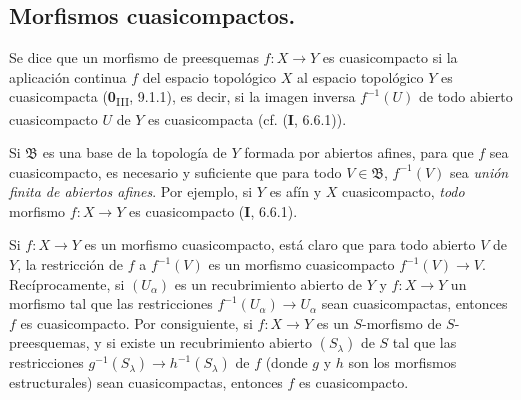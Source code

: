 \subsection{Morfismos cuasicompactos.}
\label{subsection:IV.1.1-fr}

\begin{definition}[1.1.1]
\label{IV.1.1.1-fr}
Se dice que un morfismo de preesquemas $f:X\to Y$ es cuasicompacto si
la aplicación continua $f$ del espacio topológico $X$ al espacio
topológico $Y$ es cuasicompacta \textup{(\textbf{0}\textsubscript{III}, 9.1.1)}, es
decir, si la imagen inversa $f^{-1}(U)$ de todo abierto cuasicompacto $U$ de $Y$
es cuasicompacta \textup{(cf. (\textbf{I}, 6.6.1))}.
\end{definition}

Si $\mathfrak B$ es una base de la topología de $Y$ formada por abiertos
afines, para que $f$ sea cuasicompacto, es necesario y suficiente que para todo
$V\in\mathfrak B$, $f^{-1}(V)$ sea \emph{unión finita de abiertos afines}.
Por ejemplo, si $Y$ es afín y $X$ cuasicompacto, \emph{todo} morfismo
$f:X\to Y$ es cuasicompacto (\textbf{I}, 6.6.1).

Si $f:X\to Y$ es un morfismo cuasicompacto, está claro que para todo
abierto $V$ de $Y$, la restricción de $f$ a $f^{-1}(V)$ es un morfismo
cuasicompacto $f^{-1}(V)\to V$. Recíprocamente, si $(U_\alpha)$ es un
recubrimiento abierto de $Y$ y $f:X\to Y$ un morfismo tal que las restricciones
$f^{-1}(U_\alpha)\to U_\alpha$ sean cuasicompactas, entonces $f$ es
cuasicompacto. Por
consiguiente, si $f:X\to Y$ es un $S$-morfismo de $S$-preesquemas, y si existe
un recubrimiento abierto $(S_\lambda)$ de $S$ tal que las restricciones
$g^{-1}(S_\lambda)\to h^{-1}(S_\lambda)$ de $f$ (donde $g$ y $h$ son los
morfismos estructurales) sean cuasicompactas, entonces $f$ es cuasicompacto.

